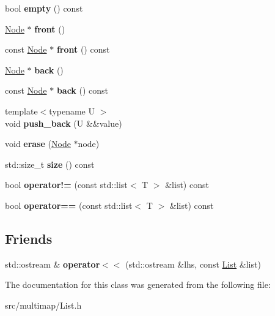 \begin{DoxyCompactItemize}
\item 
\mbox{\label{classList_a48efb87cad20cc377b6894f28fa1f3d6}} 
bool {\bfseries empty} () const
\item 
\mbox{\label{classList_ae53fccefaa350f8198cfd4be14e5fe50}} 
\hyperlink{classListNode}{Node} $\ast$ {\bfseries front} ()
\item 
\mbox{\label{classList_a9fc421bc08a96886a8964fb2fd630da5}} 
const \hyperlink{classListNode}{Node} $\ast$ {\bfseries front} () const
\item 
\mbox{\label{classList_a4dd3b0c33119b1d02d2a9baaa8ccb66e}} 
\hyperlink{classListNode}{Node} $\ast$ {\bfseries back} ()
\item 
\mbox{\label{classList_a7b1c5c2ff126ea4024f76be1525a6872}} 
const \hyperlink{classListNode}{Node} $\ast$ {\bfseries back} () const
\item 
\mbox{\label{classList_a79a20b0868ccfd922b1ca3c5411da23a}} 
{\footnotesize template$<$typename U $>$ }\\void {\bfseries push\+\_\+back} (U \&\&value)
\item 
\mbox{\label{classList_a65d7438511fac6a5891a664e6501e962}} 
void {\bfseries erase} (\hyperlink{classListNode}{Node} $\ast$node)
\item 
\mbox{\label{classList_a2de0785fcc0eae1ea84c8d98f03fcea6}} 
std\+::size\+\_\+t {\bfseries size} () const
\item 
\mbox{\label{classList_a1992616c136ae2d1de85532f90ddcba8}} 
bool {\bfseries operator!=} (const std\+::list$<$ T $>$ \&list) const
\item 
\mbox{\label{classList_a83cd5fc5c8421c96dcafa98eaf263a62}} 
bool {\bfseries operator==} (const std\+::list$<$ T $>$ \&list) const
\end{DoxyCompactItemize}
\subsection*{Friends}
\begin{DoxyCompactItemize}
\item 
\mbox{\label{classList_aec2ae45e3346472145c7de34880d66e8}} 
std\+::ostream \& {\bfseries operator$<$$<$} (std\+::ostream \&lhs, const \hyperlink{classList}{List} \&list)
\end{DoxyCompactItemize}


The documentation for this class was generated from the following file\+:\begin{DoxyCompactItemize}
\item 
src/multimap/List.\+h\end{DoxyCompactItemize}
